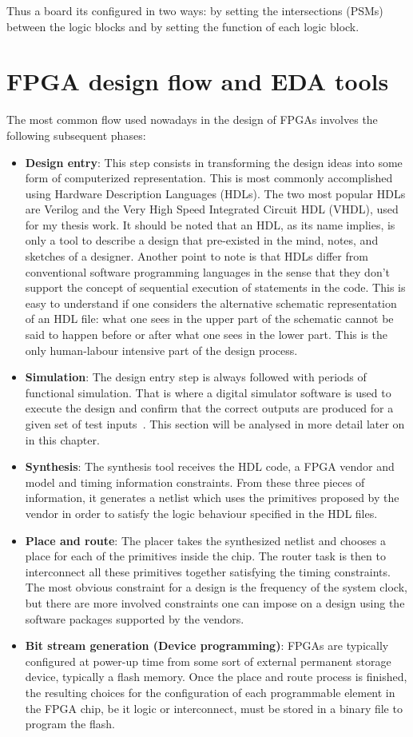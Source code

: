 \noindent Thus a board its configured in two ways: by setting the intersections (PSMs) between the logic blocks and by setting the function of each logic block.

\section{FPGA design flow and EDA tools}
\noindent The most common flow used nowadays in the design of FPGAs involves the following
subsequent phases:
\begin{itemize}
	\item \textbf{Design entry}: This step consists in transforming the design ideas into some form of
	computerized representation. This is most commonly accomplished using Hardware Description
	Languages (HDLs). The two most popular HDLs are Verilog and the Very High Speed
	Integrated Circuit HDL (VHDL), used for my thesis work. It should be noted that an HDL, as its name implies, is only
	a tool to describe a design that pre-existed in the mind, notes, and sketches of a designer. Another point to note is that HDLs differ from
	conventional software programming languages in the sense that they don’t support the concept
	of sequential execution of statements in the code. This is easy to understand if one considers the
	alternative schematic representation of an HDL file: what one sees in the upper part of the
	schematic cannot be said to happen before or after what one sees in the lower part.
	This is the only human-labour intensive part of the design process.
	\item \textbf{Simulation}: The design entry step is always followed with periods of functional simulation. That is where a digital simulator software is used to execute the design and confirm that the correct outputs are produced for a given set of test inputs~\cite{fpga4}. This section will be analysed in more detail later on in this chapter.
	\item \textbf{Synthesis}: The synthesis tool receives the HDL code, a FPGA vendor and model and timing information constraints. From
	these three pieces of information, it generates a netlist which uses the primitives proposed by the
	vendor in order to satisfy the logic behaviour specified in the HDL files.
	\item \textbf{Place and route}: The placer takes the synthesized netlist and chooses a place for each of the
	primitives inside the chip. The router task is then to interconnect all these primitives together
	satisfying the timing constraints. The most obvious constraint for a design is the frequency of
	the system clock, but there are more involved constraints one can impose on a design using the
	software packages supported by the vendors.
	\item \textbf{Bit stream generation (Device programming)}: FPGAs are typically configured at power-up time from some sort of
	external permanent storage device, typically a flash memory. Once the place and route process is
	finished, the resulting choices for the configuration of each programmable element in the FPGA
	chip, be it logic or interconnect, must be stored in a binary file to program the flash.
	
\end{itemize}

